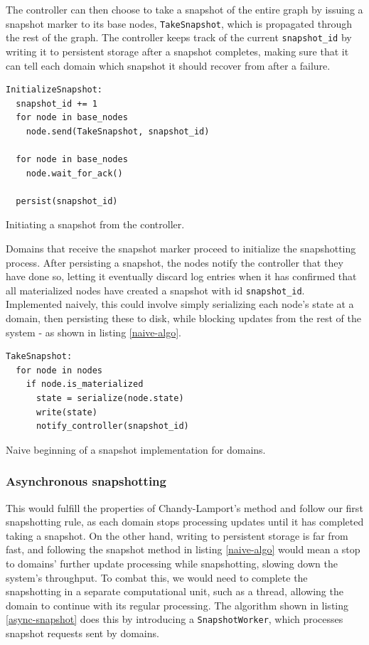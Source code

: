 \documentclass[b5paper]{report}
\begin{document}
The controller can then choose to take a snapshot of the entire graph by issuing
a snapshot marker to its base nodes, \texttt{TakeSnapshot}, which is propagated
through the rest of the graph. The controller keeps track of the current
\texttt{snapshot\_id} by writing it to persistent storage after a snapshot
completes, making sure that it can tell each domain which snapshot it should
recover from after a failure.

\begin{listing}[H]
  \begin{verbatim}
InitializeSnapshot:
  snapshot_id += 1
  for node in base_nodes
    node.send(TakeSnapshot, snapshot_id)

  for node in base_nodes
    node.wait_for_ack()

  persist(snapshot_id)
  \end{verbatim}

  \caption{Initiating a snapshot from the controller.}
\end{listing}

Domains that receive the snapshot marker proceed to initialize the
snapshotting process. After persisting a snapshot, the nodes notify the
controller that they have done so, letting it eventually discard log entries
when it has confirmed that all materialized nodes have created a snapshot with
id \texttt{snapshot\_id}. Implemented naively, this could involve simply
serializing each node's state at a domain, then persisting these to disk, while
blocking updates from the rest of the system - as shown in listing
\ref{naive-algo}.

\begin{listing}[H]
  \begin{verbatim}
TakeSnapshot:
  for node in nodes
    if node.is_materialized
      state = serialize(node.state)
      write(state)
      notify_controller(snapshot_id)
  \end{verbatim}
  \caption{
    Naive beginning of a snapshot implementation for domains.
    \label{naive-algo}
  }
\end{listing}

\subsubsection{Asynchronous snapshotting} \label{sec:async-snapshot}
This would fulfill the properties of Chandy-Lamport's method and follow our
first snapshotting rule, as each domain stops processing updates until it has
completed taking a snapshot. On the other hand, writing to persistent storage is
far from fast, and following the snapshot method in listing \ref{naive-algo}
would mean a stop to domains' further update processing while snapshotting,
slowing down the system's throughput. To combat this, we would need to complete
the snapshotting in a separate computational unit, such as a thread, allowing
the domain to continue with its regular processing. The algorithm shown in
listing \ref{async-snapshot} does this by introducing a \texttt{SnapshotWorker},
which processes snapshot requests sent by domains.
\end{document}
